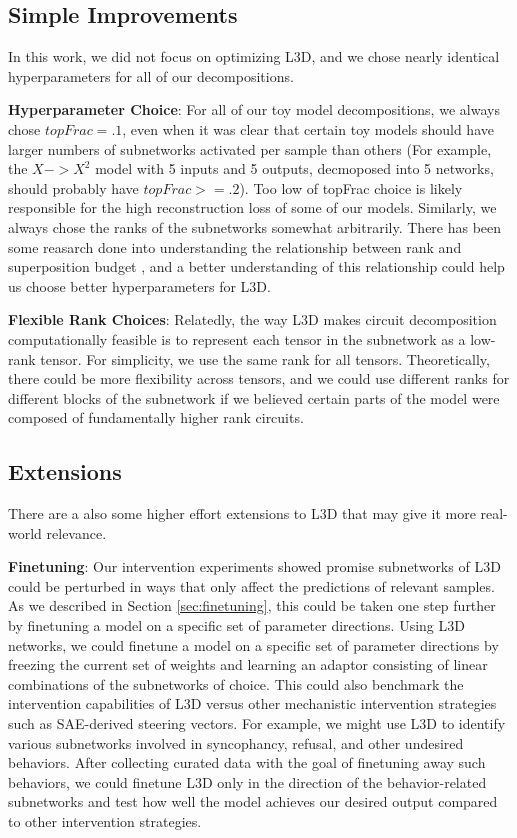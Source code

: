 \documentclass{article}
\theoremstyle{plain}
\theoremstyle{definition}
\theoremstyle{remark}
\begin{document}
\subsection{Simple Improvements}
In this work, we did not focus on optimizing L3D, and we chose nearly identical hyperparameters for all of our decompositions. 

\textbf{Hyperparameter Choice}: For all of our toy model decompositions, we always chose $topFrac=.1$, even when it was clear that certain toy models should have larger numbers of subnetworks activated per sample than others (For example, the $X->X^2$ model with 5 inputs and 5 outputs, decmoposed into 5 networks, should probably have $topFrac>=.2$). Too low of topFrac choice is likely responsible for the high reconstruction loss of some of our models. Similarly, we always chose the ranks of the subnetworks somewhat arbitrarily. There has been some reasarch done into understanding the relationship between rank and superposition budget \cite{}, and a better understanding of this relationship could help us choose better hyperparameters for L3D. 

\textbf{Flexible Rank Choices}: Relatedly, the way L3D makes circuit decomposition computationally feasible is to represent each tensor in the subnetwork as a low-rank tensor. For simplicity, we use the same rank for all tensors. Theoretically, there could be more flexibility across tensors, and we could use different ranks for different blocks of the subnetwork if we believed certain parts of the model were composed of fundamentally higher rank circuits. 

\subsection{Extensions}

There are a also some higher effort extensions to L3D that may give it more real-world relevance. 

\textbf{Finetuning}: Our intervention experiments showed promise subnetworks of L3D could be perturbed in ways that only affect the predictions of relevant samples. As we described in Section \ref{sec:finetuning}, this could be taken one step further by finetuning a model on a specific set of parameter directions. Using L3D networks, we could finetune a model on a specific set of parameter directions by freezing the current set of weights and learning an adaptor consisting of linear combinations of the subnetworks of choice. This could also benchmark the intervention capabilities of L3D versus other mechanistic intervention strategies such as SAE-derived steering vectors. For example, we might use L3D to identify various subnetworks involved in syncophancy, refusal, and other undesired behaviors. After collecting curated data with the goal of finetuning away such behaviors, we could finetune L3D only in the direction of the behavior-related subnetworks and test how well the model achieves our desired output compared to other intervention strategies. 
\end{document}
